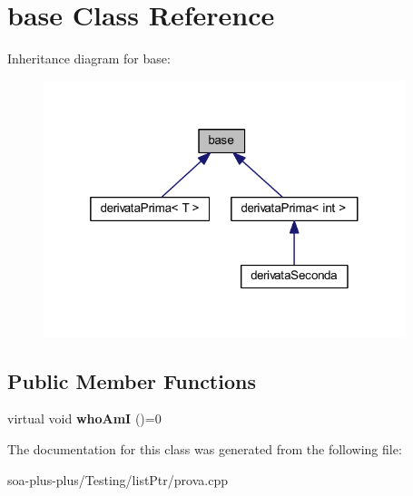 \hypertarget{classbase}{
\section{base Class Reference}
\label{classbase}
}


Inheritance diagram for base:\nopagebreak
\begin{figure}[H]
\begin{center}
\leavevmode
\includegraphics[width=299pt]{classbase__inherit__graph}
\end{center}
\end{figure}
\subsection*{Public Member Functions}
\begin{DoxyCompactItemize}
\item 
\hypertarget{classbase_a82e16643c594dce1c7fa8971ef7ec88b}{
virtual void {\bfseries whoAmI} ()=0}
\label{classbase_a82e16643c594dce1c7fa8971ef7ec88b}

\end{DoxyCompactItemize}


The documentation for this class was generated from the following file:\begin{DoxyCompactItemize}
\item 
soa-\/plus-\/plus/Testing/listPtr/prova.cpp\end{DoxyCompactItemize}
